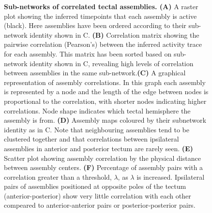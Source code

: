   \begin{figure}[!htb]
        \caption[\label{fig:R1_F8} \textbf{Sub-networks of correlated tectal assemblies}]{\label{fig:R1_F8} \textbf{Sub-networks of correlated tectal assemblies. (A)} A raster plot showing the inferred timepoints that each assembly is active (black). Here assemblies have been ordered according to their sub-network identity shown in C. \textbf{(B)} Correlation matrix showing the pairwise correlation (Pearson's) between the inferred activity trace for each assembly. This matrix has been sorted based on sub-network identity shown in C, revealing high levels of correlation between  assemblies in the same sub-network.\textbf{(C)} A graphical representation of assembly correlations. In this graph each assembly is represented by a node and the length of the edge between nodes is proportional to the correlation, with shorter nodes indicating higher correlations. Node shape indicates which tectal hemisphere the assembly is from. \textbf{(D)} Assembly maps coloured by their subnetwork identity as in C. Note that neighbouring assemblies tend to be clustered together and that correlations between ipsilateral assemblies in anterior and posterior tectum are rarely seen. \textbf{(E)} Scatter plot showing assembly correlation by the physical distance between assembly centers. \textbf{(F)} Percentage of assembly pairs with a correlation greater than a threshold, $\lambda$, as $\lambda$ is increased. Ipsilateral pairs of assemblies positioned at opposite poles of the tectum (anterior-posterior) show very little correlation with each other compeared to anterior-anterior pairs or posterior-posterior pairs.}
      \end{figure}


